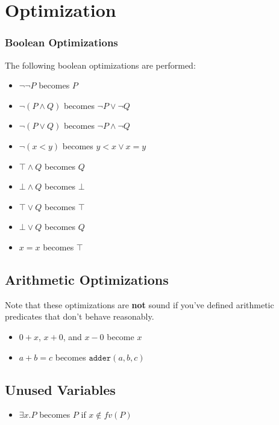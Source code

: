\section{Optimization}\label{sec:optimizations}

\subsubsection{Boolean Optimizations}

The following boolean optimizations are performed:

\begin{itemize}
    \item $\lnot \lnot P$ becomes $P$
    \item $\lnot (P \land Q)$ becomes $\lnot P \lor \lnot Q$
    \item $\lnot (P \lor Q)$ becomes $\lnot P \land \lnot Q$
    \item $\lnot (x < y)$ becomes $y < x \lor x = y$
    \item $\top \land Q$ becomes $Q$
    \item $\bot \land Q$ becomes $\bot$
    \item $\top \lor Q$ becomes $\top$
    \item $\bot \lor Q$ becomes $Q$
    \item $x = x$ becomes $\top$
\end{itemize}

\subsection{Arithmetic Optimizations}

Note that these optimizations are \textbf{not} sound if you've defined arithmetic predicates that don't behave reasonably.

\begin{itemize}
    \item $0 + x$, $x + 0$, and $x - 0$ become $x$
    \item $a + b = c$ becomes $\texttt{adder}(a, b, c)$
\end{itemize}

\subsection{Unused Variables}

\begin{itemize}
    \item $\exists x. P$ becomes $P$ if $x \not\in fv(P)$
\end{itemize}

